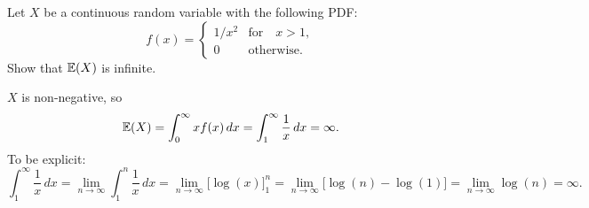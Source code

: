 \begin{example} %
Let $X$ be a continuous random variable with the following PDF:
\[
f(x) = \begin{cases}
	1/x^2		& \text{for}\quad x > 1, \\
	0			& \text{otherwise.} 
\end{cases}
\]
Show that $\mathbb{E}(X)$ is infinite.
\begin{solution}
$X$ is non-negative, so 
\[
\mathbb{E}(X) 
	= \int_{0}^{\infty} x f(x)\,dx
	= \int_{1}^{\infty} \frac{1}{x}\,dx
	= \infty.
\]
To be explicit:
\[
\int_{1}^{\infty} \frac{1}{x}\,dx
	= \lim_{n\to\infty} \int_{1}^{n} \frac{1}{x}\,dx
	= \lim_{n\to\infty} \big[\log(x)\big]_{1}^{n}
	= \lim_{n\to\infty} \big[\log(n) - \log(1)\big]
	= \lim_{n\to\infty} \log(n)
	= \infty.
\]
\end{solution}
\end{example}




